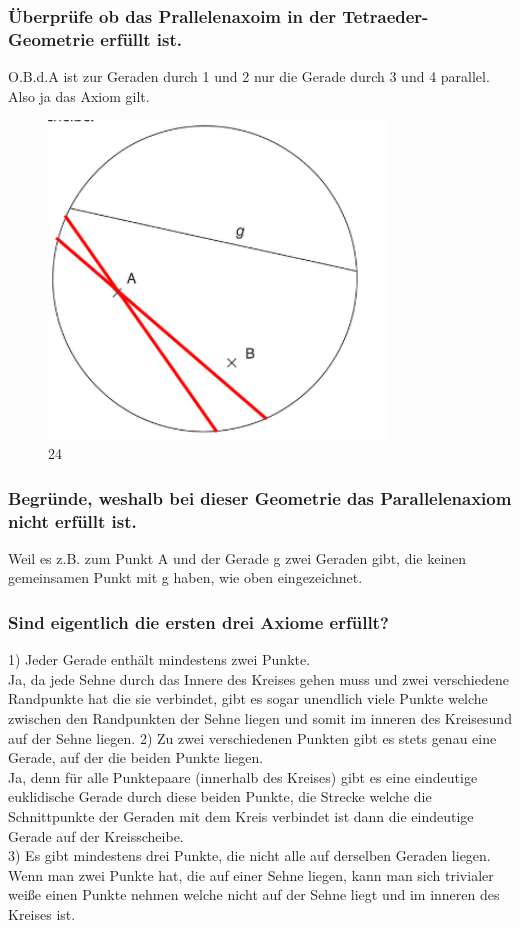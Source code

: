 \documentclass[12pt,a4paper]{article}
\begin{document}
\subsubsection*{Überprüfe ob das Prallelenaxoim in der Tetraeder-Geometrie erfüllt ist.}
O.B.d.A ist zur Geraden durch 1 und 2 nur die Gerade durch 3 und 4 parallel. Also ja das Axiom gilt.

\newpage
\begin{figure}[htbp]     
    \centering             
    \includegraphics[width=0.8\textwidth]{Kreisscheibe.png}     
    \caption{24}     
    \label{fig:24} 
\end{figure}
\subsubsection*{Begründe, weshalb bei dieser Geometrie das Parallelenaxiom nicht erfüllt ist.}
Weil es z.B. zum Punkt A und der Gerade g zwei Geraden gibt, die keinen gemeinsamen Punkt mit g haben, wie oben eingezeichnet.
\subsubsection*{Sind eigentlich die ersten drei Axiome erfüllt?}
1) Jeder Gerade enthält mindestens zwei Punkte.\\
Ja, da jede Sehne durch das Innere des Kreises gehen muss und zwei verschiedene Randpunkte hat die sie verbindet, gibt es sogar unendlich viele Punkte welche zwischen den Randpunkten der Sehne liegen und somit im inneren des Kreisesund auf der Sehne liegen.
2) Zu zwei verschiedenen Punkten gibt es stets genau eine Gerade, auf der die beiden Punkte liegen.\\
Ja, denn für alle Punktepaare (innerhalb des Kreises) gibt es eine eindeutige euklidische Gerade durch diese beiden Punkte, die Strecke welche die Schnittpunkte der Geraden mit dem Kreis verbindet ist dann die eindeutige Gerade auf der Kreisscheibe.\\
3) Es gibt mindestens drei Punkte, die nicht alle auf derselben Geraden liegen.\\
Wenn man zwei Punkte hat, die auf einer Sehne liegen, kann man sich trivialer weiße einen Punkte nehmen welche nicht auf der Sehne liegt und im inneren des Kreises ist.
\end{document}

